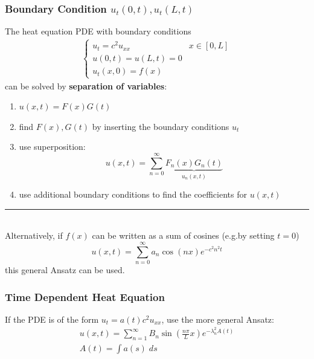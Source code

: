 \subsubsection{Boundary Condition \texorpdfstring{$u_{t}(0,t),u_{t}(L,t)$}{ut (0,t), ut (L,t)}}
The heat equation PDE with boundary conditions
\begin{align*}
    \begin{cases}
        u_t=c^2u_{xx} & x\in[0,L] \\
        u(0,t)=u(L,t)=0           \\
        u_t(x,0)=f(x)
    \end{cases}
\end{align*}
can be solved by \textbf{separation of variables}:
\begin{enumerate}
    \item $u(x,t)=F(x)G(t)$
    \item find $F(x),G(t)$ by inserting the boundary conditions $u_t$
    \item use superposition:
          \begin{equation*}
              u(x,t)=\sum_{n=0}^{\infty} \underbrace{F_n(x)G_n(t)}_{u_n(x,t)}
          \end{equation*}
    \item use additional boundary conditions to find the coefficients for $u(x,t)$
\end{enumerate}
{\color{gray}\hrule}\, \\
Alternatively, if $f(x)$ can be written as a sum of cosines (e.g.\@ by setting $t = 0$)
\begin{equation*}
    u(x,t)=\sum_{n=0}^{\infty}a_n\cos(nx)e^{-c^2n^2t}
\end{equation*}
this general Ansatz can be used.
\subsubsection{Time Dependent Heat Equation}
If the PDE is of the form $u_t=a(t) c^2 u_{xx}$, use the more general Ansatz:
\begin{gather*}
    u(x,t) =\sum_{n=1}^\infty B_n\sin(\frac{n\pi}Lx)e^{-\lambda_n^2 A(t)} \\
    A(t)=\int a(s)\;ds
\end{gather*}

